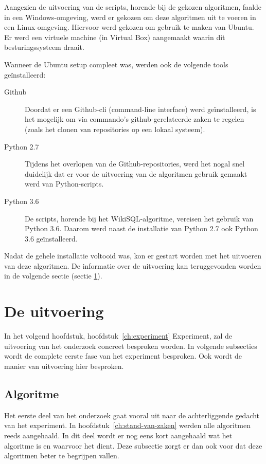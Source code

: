 Aangezien de uitvoering van de scripts, horende bij de gekozen algoritmen, faalde in een Windows-omgeving, werd er gekozen om deze algoritmen uit te voeren in een Linux-omgeving. Hiervoor werd gekozen om gebruik te maken van Ubuntu. Er werd een virtuele machine (in Virtual Box) aangemaakt waarin dit besturingssysteem draait.

Wanneer de Ubuntu setup compleet was, werden ook de volgende tools geïnstalleerd:
\begin{description}
	\item[Github] Doordat er een Github-cli (command-line interface) werd geïnstalleerd, is het mogelijk om via commando's github-gerelateerde zaken te regelen (zoals het clonen van repositories op een lokaal systeem).
	\item[Python 2.7] Tijdens het overlopen van de Github-repositories, werd het nogal snel duidelijk dat er voor de uitvoering van de algoritmen gebruik gemaakt werd van Python-scripts.
	\item[Python 3.6] De scripts, horende bij het WikiSQL-algoritme, vereisen het gebruik van Python 3.6. Daarom werd naast de installatie van Python 2.7 ook Python 3.6 geïnstalleerd.
\end{description}

Nadat de gehele installatie voltooid was, kon er gestart worden met het uitvoeren van deze algoritmen. De informatie over de uitvoering kan teruggevonden worden in de volgende sectie (sectie \ref{sec:uitvoering}).

\section{De uitvoering}
\label{sec:uitvoering}

In het volgend hoofdstuk, hoofdstuk~\ref{ch:experiment} Experiment, zal de uitvoering van het onderzoek concreet besproken worden. In volgende subsecties wordt de complete eerste fase van het experiment besproken. Ook wordt de manier van uitvoering hier besproken.

\subsection{Algoritme}

Het eerste deel van het onderzoek gaat vooral uit naar de achterliggende gedacht van het experiment. In hoofdstuk~\ref{ch:stand-van-zaken} werden alle algoritmen reeds aangehaald. In dit deel wordt er nog eens kort aangehaald wat het algoritme is en waarvoor het dient. Deze subsectie zorgt er dan ook voor dat deze algoritmen beter te begrijpen vallen. 

